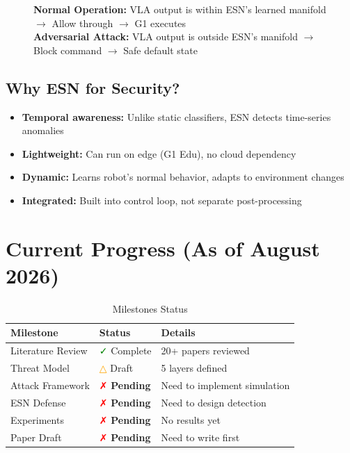 \documentclass[conference]{IEEEtran}
\begin{document}
\begin{figure}[h]
\centering
\begin{minipage}{0.8\textwidth}
\textbf{Normal Operation:} VLA output is within ESN's learned manifold $\to$ Allow through $\to$ G1 executes \\
\textbf{Adversarial Attack:} VLA output is outside ESN's manifold $\to$ Block command $\to$ Safe default state
\end{minipage}
\end{figure}

\subsection{Why ESN for Security?}
\begin{itemize}
    \item \textbf{Temporal awareness:} Unlike static classifiers, ESN detects time-series anomalies
    \item \textbf{Lightweight:} Can run on edge (G1 Edu), no cloud dependency
    \item \textbf{Dynamic:} Learns robot's normal behavior, adapts to environment changes
    \item \textbf{Integrated:} Built into control loop, not separate post-processing
\end{itemize}

\section{Current Progress (As of August 2026)}

\begin{table}[h]
\centering
\caption{Milestones Status}
\label{tab:security-progress}
\begin{tabular}{lll}
\toprule
\textbf{Milestone} & \textbf{Status} & \textbf{Details} \\
\midrule
Literature Review & \textcolor{green}{✓} Complete & 20+ papers reviewed \\
Threat Model & \textcolor{orange}{△} Draft & 5 layers defined \\
Attack Framework & \textcolor{red}{✗} \textbf{Pending} & Need to implement simulation \\
ESN Defense & \textcolor{red}{✗} \textbf{Pending} & Need to design detection \\
Experiments & \textcolor{red}{✗} \textbf{Pending} & No results yet \\
Paper Draft & \textcolor{red}{✗} \textbf{Pending} & Need to write first \\
\bottomrule
\end{tabular}
\end{table}
\end{document}
